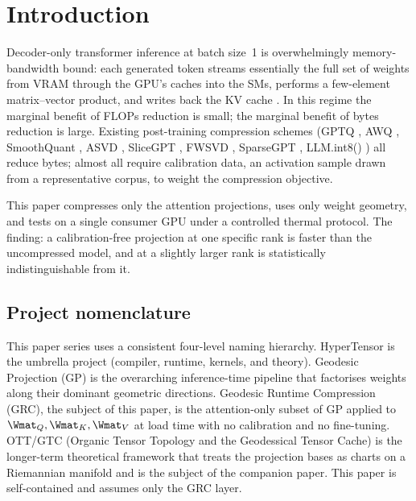 \documentclass[11pt]{article}
\begin{document}
\clearpage

\clearpage

\section{Introduction}
\label{sec:intro}
Decoder-only transformer inference at batch size~1 is overwhelmingly
memory-bandwidth bound: each generated token streams essentially the
full set of weights from VRAM through the GPU's caches into the SMs, performs
a few-element matrix--vector product, and writes back the KV cache
\cite{williams2009roofline,yuan2024llmroofline}.  In this regime the marginal
benefit of FLOPs reduction is small; the marginal benefit of bytes
reduction is large.  Existing post-training compression schemes
(GPTQ \cite{frantar2022gptq}, AWQ \cite{lin2023awq}, SmoothQuant
\cite{xiao2022smoothquant}, ASVD \cite{yuan2023asvd},
SliceGPT \cite{ashkboos2024slicegpt}, FWSVD \cite{hsu2022fwsvd},
SparseGPT \cite{frantar2023sparsegpt}, LLM.int8() \cite{dettmers2022llmint8})
all reduce bytes; almost all require calibration data, an activation
sample drawn from a representative corpus, to weight the compression
objective.

This paper compresses only the attention projections, uses only weight geometry, and tests on a single consumer GPU under a controlled thermal
protocol. The finding: a calibration-free projection at one specific
rank is faster than the uncompressed model, and at a slightly larger rank
is statistically indistinguishable from it.

\subsection{Project nomenclature}
\label{sec:nomenclature}
This paper series uses a consistent four-level naming hierarchy.
HyperTensor is the umbrella project (compiler, runtime, kernels,
and theory). Geodesic Projection (GP) is the overarching
inference-time pipeline that factorises weights along their dominant
geometric directions. Geodesic Runtime Compression (GRC), the
subject of this paper, is the attention-only subset of GP applied to
$\Wmat_Q,\Wmat_K,\Wmat_V$ at load time with no calibration and no
fine-tuning. OTT/GTC (Organic Tensor Topology and the Geodessical
Tensor Cache) is the longer-term theoretical framework that treats the
projection bases as charts on a Riemannian manifold and is the subject of
the companion paper. This paper is self-contained and assumes only the GRC
layer.
\end{document}
